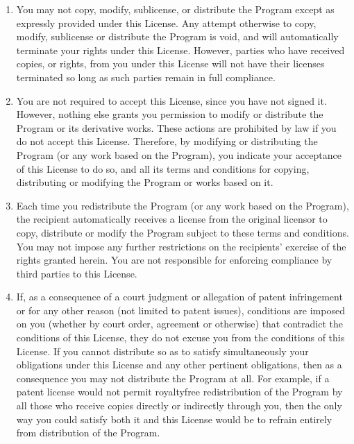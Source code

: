 \documentclass[letterpaper,10pt,english]{sphinxmanual}
\begin{document}
\begin{enumerate}
%
\setcounter{enumi}{3}
\item {} 
\sphinxAtStartPar
You may not copy, modify, sublicense, or distribute the Program except as expressly provided under this License. Any attempt otherwise to copy, modify, sublicense or distribute the Program is void, and will automatically terminate your rights under this License. However, parties who have received copies, or rights, from you under this License will not have their licenses terminated so long as such parties remain in full compliance.

\item {} 
\sphinxAtStartPar
You are not required to accept this License, since you have not signed it. However, nothing else grants you permission to modify or distribute the Program or its derivative works. These actions are prohibited by law if you do not accept this License. Therefore, by modifying or distributing the Program (or any work based on the Program), you indicate your acceptance of this License to do so, and all its terms and conditions for copying, distributing or modifying the Program or works based on it.

\item {} 
\sphinxAtStartPar
Each time you redistribute the Program (or any work based on the Program), the recipient automatically receives a license from the original licensor to copy, distribute or modify the Program subject to these terms and conditions. You may not impose any further restrictions on the recipients’ exercise of the rights granted herein. You are not responsible for enforcing compliance by third parties to this License.

\item {} 
\sphinxAtStartPar
If, as a consequence of a court judgment or allegation of patent infringement or for any other reason (not limited to patent issues), conditions are imposed on you (whether by court order, agreement or otherwise) that contradict the conditions of this License, they do not excuse you from the conditions of this License. If you cannot distribute so as to satisfy simultaneously your obligations under this License and any other pertinent obligations, then as a consequence you may not distribute the Program at all. For example, if a patent license would not permit royalty\sphinxhyphen{}free redistribution of the Program by all those who receive copies directly or indirectly through you, then the only way you could satisfy both it and this License would be to refrain entirely from distribution of the Program.

\end{enumerate}
\end{document}
